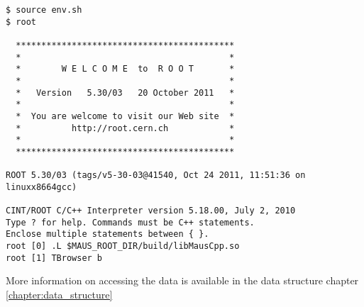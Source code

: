 \begin{verbatim}
$ source env.sh
$ root

  *******************************************
  *                                         *
  *        W E L C O M E  to  R O O T       *
  *                                         *
  *   Version   5.30/03   20 October 2011   *
  *                                         *
  *  You are welcome to visit our Web site  *
  *          http://root.cern.ch            *
  *                                         *
  *******************************************

ROOT 5.30/03 (tags/v5-30-03@41540, Oct 24 2011, 11:51:36 on linuxx8664gcc)

CINT/ROOT C/C++ Interpreter version 5.18.00, July 2, 2010
Type ? for help. Commands must be C++ statements.
Enclose multiple statements between { }.
root [0] .L $MAUS_ROOT_DIR/build/libMausCpp.so
root [1] TBrowser b
\end{verbatim}

More information on accessing the data is available in the data structure chapter \ref{chapter:data_structure}

